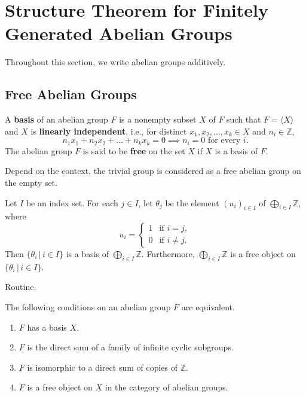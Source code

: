 \section{Structure Theorem for Finitely Generated Abelian Groups}
Throughout this section, we write abelian groups additively.
\subsection{Free Abelian Groups}


\begin{definition} \label{def-free-abelian}
	A \textbf{basis} of an abelian group $F$ is a nonempty subset $X$ of $F$ such that $F = \langle X \rangle$ and $X$ is \textbf{linearly independent}, i.e., for distinct $x_1, x_2, \dots, x_k \in X$ and $n_i \in \mathbb{Z}$,
	\begin{equation*}
		n_1x_1 + n_2x_2 + \dots + n_kx_k = 0 \implies n_i = 0 \text{ for every } i.
	\end{equation*}
	The abelian group $F$ is said to be \textbf{free} on the set $X$ if $X$ is a basis of $F$. 
\end{definition}
\begin{remark}
	Depend on the context, the trivial group is considered as a free abelian group on the empty set.
\end{remark}
\begin{lemma} \label{lemma-basis-for-sum-Z}
	Let $I$ be an index set. For each $j \in I$, let $\theta_j$ be the element $(u_i)_{i\in I}$ of $\bigoplus_{i\in I} \mathbb{Z}$, where
	\begin{equation*}
		u_i = \begin{cases}
			1 & \text{if } i = j,\\
			0 & \text{if } i\neq j.
		\end{cases}
	\end{equation*} Then $\{\theta_i \,|\,  i \in I\}$ is a basis of $\bigoplus_{i\in I} \mathbb{Z}$. Furthermore, $\bigoplus_{i\in I} \mathbb{Z}$ is a free object on  $\{\theta_i \,|\, i \in I\}$.
\end{lemma}
\begin{sketch}
	Routine.
\end{sketch}
\begin{proposition} \label{prop-free-abelian-eqv}
	The following conditions on an abelian group $F$ are equivalent.
	\begin{enumerate}[(1)]
		\item $F$ has a basis $X$.
		\item $F$ is the  direct sum of a family of infinite cyclic subgroups.
		\item $F$ is isomorphic to a direct sum of copies of $\mathbb{Z}$.
		\item $F$ is a free object on $X$ in the category of abelian groups.
	\end{enumerate}
\end{proposition}

